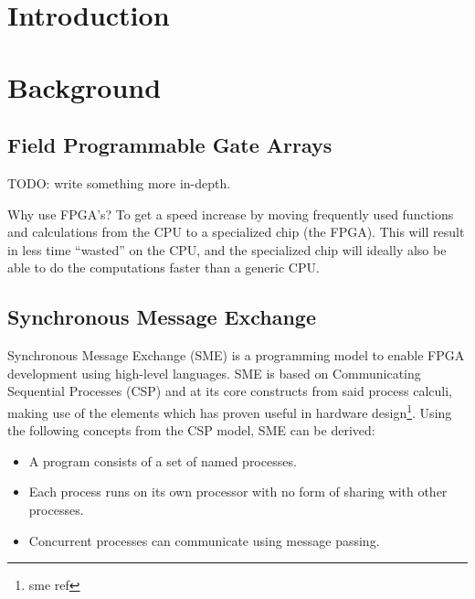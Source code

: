 \documentclass[a4paper]{article}
\date{}
\title{}
\begin{document}
\maketitle
\tableofcontents
\newpage
\section{Introduction}
\label{sec:org1e5d452}

\section{Background}
\label{sec:orgb54cbc0}

\subsection{Field Programmable Gate Arrays}
\label{sec:org299e245}
TODO: write something more in-depth.

Why use FPGA's? To get a speed increase by moving frequently used functions and calculations from the CPU to a specialized chip (the FPGA).
This will result in less time ``wasted'' on the CPU, and the specialized chip will ideally also be able to do the computations faster than a generic CPU.

\subsection{Synchronous Message Exchange}
\label{SME}
Synchronous Message Exchange (SME) is a programming model to enable FPGA development using high-level languages. SME is based on Communicating Sequential Processes (CSP) and at its core constructs from said process calculi, making use of the elements which has proven useful in hardware design\cite{sme}\footnote{sme ref}. Using the following concepts from the CSP model\cite{CSP}, SME can be derived:

\begin{itemize}
\item A program consists of a set of named processes.
\item Each process runs on its own processor with no form of sharing with other processes.
\item Concurrent processes can communicate using message passing.
\end{itemize}
\end{document}
